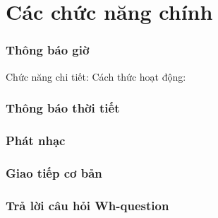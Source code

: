 \section{Các chức năng chính}
\subsubsection{Thông báo giờ}
Chức năng chi tiết:
Cách thức hoạt động:
\subsubsection{Thông báo thời tiết}
\subsubsection{Phát nhạc}
\subsubsection{Giao tiếp cơ bản}
\subsubsection{Trả lời câu hỏi Wh-question}
